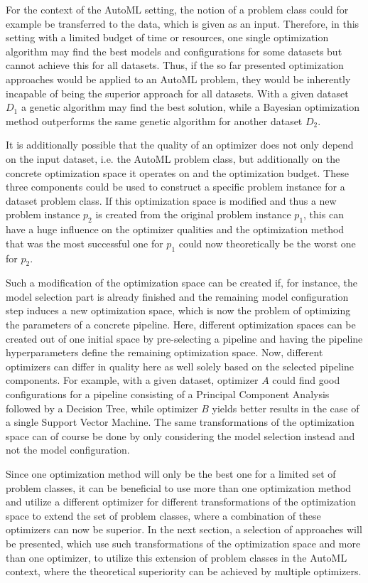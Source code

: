 For the context of the AutoML setting, the notion of a problem class could for example be transferred to the data, which is given as an input.
Therefore, in this setting with a limited budget of time or resources, one single optimization algorithm may find the best models and configurations for some datasets but cannot achieve this for all datasets.
Thus, if the so far presented optimization approaches would be applied to an AutoML problem, they would be inherently incapable of being the superior approach for all datasets.
With a given dataset $D_1$ a genetic algorithm may find the best solution, while a Bayesian optimization method outperforms the same genetic algorithm for another dataset $D_2$.

It is additionally possible that the quality of an optimizer does not only depend on the input dataset, i.e. the AutoML problem class, but additionally on the concrete optimization space it operates on and the optimization budget.
These three components could be used to construct a specific problem instance for a dataset problem class.\newline
If this optimization space is modified and thus a new problem instance $p_2$ is created from the original problem instance $p_1$, this can have a huge influence on the optimizer qualities and the optimization method that was the most successful one for $p_1$ could now theoretically be the worst one for $p_2$.

Such a modification of the optimization space can be created if, for instance, the model selection part is already finished and the remaining model configuration step induces a new optimization space, which is now the problem of optimizing the parameters of a concrete pipeline.
Here, different optimization spaces can be created out of one initial space by pre-selecting a pipeline and having the pipeline hyperparameters define the remaining optimization space.\newline
Now, different optimizers can differ in quality here as well solely based on the selected pipeline components.
For example, with a given dataset, optimizer $A$ could find good configurations for a pipeline consisting of a Principal Component Analysis followed by a Decision Tree, while optimizer $B$ yields better results in the case of a single Support Vector Machine.
The same transformations of the optimization space can of course be done by only considering the model selection instead and not the model configuration.

Since one optimization method will only be the best one for a limited set of problem classes, it can be beneficial to use more than one optimization method and utilize a different optimizer for different transformations of the optimization space to extend the set of problem classes, where a combination of these optimizers can now be superior.\newline
In the next section, a selection of approaches will be presented, which use such transformations of the optimization space and more than one optimizer, to utilize this extension of problem classes in the AutoML context, where the theoretical superiority can be achieved by multiple optimizers.

